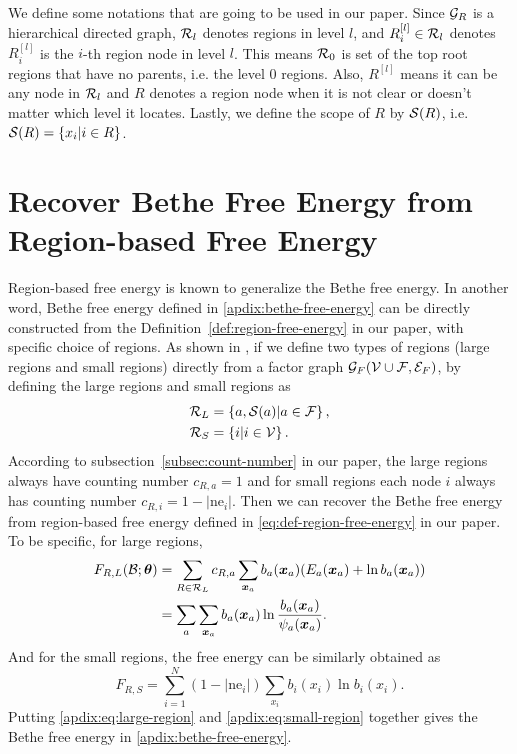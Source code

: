 We define some notations that are going to be used in our paper. Since $\mathcal{G}_R$ is a hierarchical directed graph, $\mathcal{R}_l$ denotes regions in level $l$, and 
$R^{[l]}_i\in \mathcal{R}_l$ denotes $R^{[l]}_i$ is the $i$-th region node in level $l$. This means $\mathcal{R}_0$ is set of the top root regions that have no parents, i.e. the level $0$ regions. Also, $R^{[l]}$ means it can be any node in $\mathcal{R}_l$ and $R$ denotes a region node when it is not clear or doesn't matter which level it locates. Lastly, we define the scope of $R$ by $\mathcal{S}(R)$, i.e. $\mathcal{S}(R) = \left\{ x_i| i \in R \right\}$.




\section{Recover Bethe Free Energy from Region-based Free Energy}
\label{apdix:sec:get-bethe-from-region-energy}
Region-based free energy is known to generalize the Bethe free energy. In another word, Bethe free energy defined in \eqref{apdix:bethe-free-energy} can be directly constructed
from the Definition~\ref{def:region-free-energy} in our paper, with
specific choice of regions. As shown in \cite{yedida2005constucting},
if we define two types of regions (large regions and small
regions) directly from a factor graph $\mathcal{G}_F(\mathcal{V} \cup \mathcal{F}, \mathcal{E}_F)$, by defining the large regions and small regions as
\begin{align}
  \mathcal{R}_{L} &= \left\{ a, \mathcal{S}(a)| a\in \mathcal{F} \right\}, \nonumber \\
  \mathcal{R}_{S} &= \left\{ i | i \in \mathcal{V} \right\}.
\end{align}
According to subsection~\ref{subsec:count-number} in our paper, the large regions always have counting number $c_{R,a}=1$ and for small regions each node $i$ always has counting number $c_{R,i}=1-|\mathrm{ne}_i|$. Then we can recover the Bethe free energy from region-based free energy defined in 
\eqref{eq:def-region-free-energy} in our paper. To be specific, for
large regions,
\begin{align}\label{apdix:eq:large-region}
  F_{R,L}(\mathcal{B}; \bm{\theta}) &=\sum_{R\in \mathcal{R}_{L}} c_{R,a}
                              \sum_{\bm{x}_a}b_a(\bm{x}_a) (E_a(\bm{x}_a) + \ln{b_a}(\bm{x}_a))
                              \nonumber \\
                            & =\sum_{a} \sum_{\bm{x}_a} b_a(\bm{x}_a)\ln{\frac{b_a(\bm{x}_a)}{\psi_a(\bm{x}_a)}}.
\end{align}
And for the small regions, the free energy can be similarly obtained as
\begin{equation}\label{apdix:eq:small-region}
  F_{R,S}  =  \sum_{i=1}^{N} (1- |\mathrm{ne}_i|) \sum_{x_i} b_i(x_i) \ln{b_i(x_i)}.
\end{equation}
Putting \eqref{apdix:eq:large-region} and \eqref{apdix:eq:small-region} together gives the Bethe free energy in \eqref{apdix:bethe-free-energy}.


